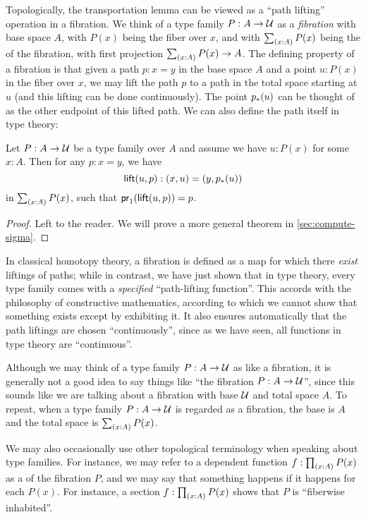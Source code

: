 Topologically, the transportation lemma can be viewed as a ``path lifting'' operation in a fibration.
%
%
We think of a type family $P:A\to \mathcal{U}$ as a \emph{fibration} with base space $A$, with $P(x)$ being the fiber over $x$, and with $\sm{x:A}P(x)$ being the  of the fibration, with first projection $\sm{x:A}P(x)\to A$.
The defining property of a fibration is that given a path $p:x=y$ in the base space $A$ and a point $u:P(x)$ in the fiber over $x$, we may lift the path $p$ to a path in the total space starting at $u$ (and this lifting can be done continuously).
The point ${p}_{*}\mathopen{}\left({u}\right)\mathclose{}$ can be thought of as the other endpoint of this lifted path.
We can also define the path itself in type theory:

\begin{lem}\label{thm:path-lifting}
  Let $P:A\to\mathcal{U}$ be a type family over $A$ and assume we have $u:P(x)$ for some $x:A$.
  Then for any $p:x=y$, we have
  \begin{equation*}
    \mathsf{lift}(u,p):(x,u)=(y,{p}_{*}\mathopen{}\left({u}\right)\mathclose{})
  \end{equation*}
  in $\sm{x:A}P(x)$, such that ${\mathsf{pr}_{1}}\mathopen{}\left({\mathsf{lift}(u,p)}\right)\mathclose{} = p$.
\end{lem}
\begin{proof}
  Left to the reader.
  We will prove a more general theorem in \autoref{sec:compute-sigma}.
\end{proof}

In classical homotopy theory, a fibration is defined as a map for which there \emph{exist} liftings of paths; while in contrast, we have just shown that in type theory, every type family comes with a \emph{specified} ``path-lifting function''.
This accords with the philosophy of constructive mathematics, according to which we cannot show that something exists except by exhibiting it.
%
It also ensures automatically that the path liftings are chosen ``continuously'', since as we have seen, all functions in type theory are ``continuous''.

\begin{rmk}
  Although we may think of a type family $P:A\to \mathcal{U}$ as like a fibration, it is generally not a good idea to say things like ``the fibration $P:A\to\mathcal{U}$'', since this sounds like we are talking about a fibration with base $\mathcal{U}$ and total space $A$.
  To repeat, when a type family $P:A\to \mathcal{U}$ is regarded as a fibration, the base is $A$ and the total space is $\sm{x:A} P(x)$.

  We may also occasionally use other topological terminology when speaking about type families.
  For instance, we may refer to a dependent function $f:\prd{x:A} P(x)$ as a 
  of the fibration $P$, and we may say that something happens 
  if it happens for each $P(x)$.
  For instance, a section $f:\prd{x:A} P(x)$ shows that $P$ is ``fiberwise inhabited''.
\end{rmk}

